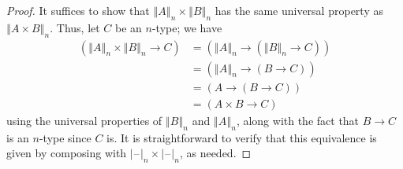 \documentclass[10pt,a4paper]{article}
\newcommand{\trunc}[2]{\mathopen{}\left\Vert #2\right\Vert_{#1}\mathclose{}}
\newcommand{\tprojf}[2][]{|\blank|_{#2}^{#1}}
\newcommand{\blank}{\mathord{\hspace{1pt}\text{--}\hspace{1pt}}}
\theoremstyle{definition}
\theoremstyle{remark}
\numberwithin{equation}{section}
\begin{document}
\begin{proof}
  It suffices to show that $\trunc nA \times \trunc nB$ has the same universal property as $\trunc n{A\times B}$.
  Thus, let $C$ be an $n$-type; we have
  \begin{align*}
    (\trunc nA \times \trunc nB \to C)
    &= (\trunc nA \to (\trunc nB \to C))\\
    &= (\trunc nA \to (B \to C))\\
    &= (A \to (B \to C))\\
    &= (A \times B \to C)
  \end{align*}
  using the universal properties of $\trunc nB$ and $\trunc nA$, along with the fact that $B\to C$ is an $n$-type since $C$ is.
  It is straightforward to verify that this equivalence is given by composing with $\tprojf n \times \tprojf n$, as needed.
\end{proof}
\end{document}
